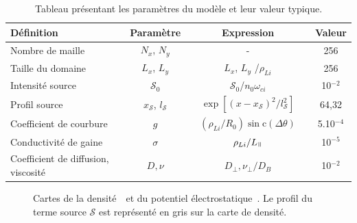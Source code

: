 \begin{refsection}
\begin{table}[!htbp]
\footnotesize\centering
{}
\begin{tabular}{@{}lcccccc@{}}\toprule
Définition&&Paramètre&&Expression&&Valeur\\
\midrule 
Nombre de maille&&$N_x$, $N_y$ && - && 256\\
Taille du domaine&&$L_x$, $L_y$ &&$L_x$, $L_y$ /$\rho_{Li}$ && 256\\
Intensité source&&$\mathcal{S}_0$ &&
$\mathcal{S}_0$/$n_0\omega_{ci}$
&& 10$^{-2}$\\
Profil source&& $x_\mathcal{S}$,
$l_\mathcal{S}$ && $\exp[(x-x_\mathcal{S})^2/l_\mathcal{S}^2]$
&& 64,32\\
Coefficient de courbure&&$g$ &&
$(\rho_{Li}/R_0)\sin\text{c}(\Delta\theta)$\footnotemark &&
5.10$^{-4}$\\
Conductivité de gaine&&$\sigma$ &&
$\rho_{Li}/L_\para$ &&
10$^{-5}$\\
Coefficient de diffusion, viscosité&&$D,\nu$ &&
$D_\perp,\nu_\perp/D_B$ &&
10$^{-2}$\\
\bottomrule
\end{tabular}
\caption{Tableau présentant les paramètres du modèle et
leur valeur typique.}\label{2-TokamParam}
\end{table}

\begin{figure}[!htbp]
    \centering
    \caption{Cartes de la densité~~et du potentiel
    électrostatique~. Le profil du terme source
    $\mathcal{S}$ est représenté en gris sur la carte de densité.
    }
    \label{2-CartesBase}
\end{figure}


\end{refsection}
